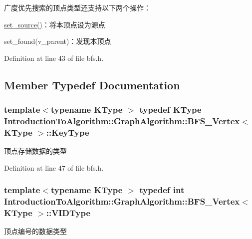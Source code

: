 广度优先搜索的顶点类型还支持以下两个操作：


\begin{DoxyItemize}
\item {\ttfamily \hyperlink{struct_introduction_to_algorithm_1_1_graph_algorithm_1_1_b_f_s___vertex_a3f5b9ba686fae02e01cd899261fe6793}{set\+\_\+source()}}：将本顶点设为源点
\item {\ttfamily set\+\_\+found(v\+\_\+parent)}：发现本顶点 
\end{DoxyItemize}

Definition at line 43 of file bfs.\+h.



\subsection{Member Typedef Documentation}
\hypertarget{struct_introduction_to_algorithm_1_1_graph_algorithm_1_1_b_f_s___vertex_a1e47ba34939458c68d7ccee8ebeccad2}{}
\subsubsection[{Key\+Type}]{\setlength{\rightskip}{0pt plus 5cm}template$<$typename K\+Type $>$ typedef K\+Type {\bf Introduction\+To\+Algorithm\+::\+Graph\+Algorithm\+::\+B\+F\+S\+\_\+\+Vertex}$<$ K\+Type $>$\+::{\bf Key\+Type}}\label{struct_introduction_to_algorithm_1_1_graph_algorithm_1_1_b_f_s___vertex_a1e47ba34939458c68d7ccee8ebeccad2}
顶点存储数据的类型 

Definition at line 47 of file bfs.\+h.

\hypertarget{struct_introduction_to_algorithm_1_1_graph_algorithm_1_1_b_f_s___vertex_a62cef758843cdaeefae2fc196f6bdb46}{}
\subsubsection[{V\+I\+D\+Type}]{\setlength{\rightskip}{0pt plus 5cm}template$<$typename K\+Type $>$ typedef int {\bf Introduction\+To\+Algorithm\+::\+Graph\+Algorithm\+::\+B\+F\+S\+\_\+\+Vertex}$<$ K\+Type $>$\+::{\bf V\+I\+D\+Type}}\label{struct_introduction_to_algorithm_1_1_graph_algorithm_1_1_b_f_s___vertex_a62cef758843cdaeefae2fc196f6bdb46}
顶点编号的数据类型 

